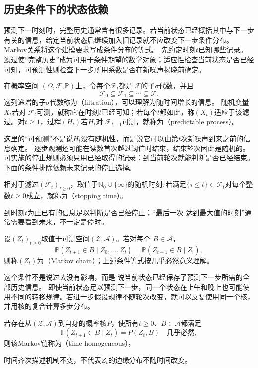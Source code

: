 \subsection{历史条件下的状态依赖}

预测下一时刻时，完整历史通常含有很多记录。若当前状态已经概括其中与下一步有关的信息，给定当前状态后继续加入旧记录就不应改变下一步条件分布。Markov关系将这个建模要求写成条件分布的等式。
\label{sec:rv-markov}
\label{sec:stoch-martingales-stopping-sequential-concentration}
先约定时刻\(t\)已知哪些记录。滤过使“完整历史”成为可用于条件期望的数学对象；适应性检查当前状态是否已经可知，可预测性则检查下一步所用系数是否在新噪声揭晓前确定。
\begin{definition}[滤过、适应与可预测性]
  \label{def:stoch-filtration-adaptation-predictability}
在概率空间
$(\Omega,\mathcal{F},\mathbb{P})$上，令每个$\mathcal{F}_t$都是
$\mathcal{F}$的子$\sigma$代数，并且
\[
  \mathcal{F}_0\subseteq\mathcal{F}_1\subseteq\cdots\subseteq\mathcal{F}.
\]
这列递增的子$\sigma$代数称为（filtration），可以理解为随时间增长的信息。
随机变量$X_t$若对
$\mathcal{F}_t$可测，就称它在时刻$t$已经可知；若每个$t$都如此，称$(X_t)$适应于该滤过。对$t\geq1$，过程$(H_t)$若$H_t$对
$\mathcal{F}_{t-1}$可测，就称为（predictable process）。
\end{definition}
这里的“可预测”不是说$H_t$没有随机性，而是说它可以由第$t$次新噪声到来之前的信息确定。
逐步观测还可能在读数首次越过阈值时结束，结束轮次因此是随机的。可实施的停止规则必须只用已经取得的记录：到当前轮次就能判断是否已经结束。下面的条件排除依赖未来记录的停止选择。
\begin{definition}[停时]
  \label{def:stoch-stopping-time}
  相对于滤过\((\mathcal F_t)_{t\geq0}\)，取值于\(\mathbb N_0\cup\{\infty\}\)的随机时刻$\tau$若满足$\{\tau\leq t\}\in\mathcal{F}_t$对每个整数$t\geq0$成立，就称为（stopping time）。
\end{definition}
到时刻$t$为止已有的信息足以判断是否已经停止；“最后一次
达到最大值的时刻”通常需要看到未来，不一定是停时。

\begin{definition}[Markov链]
  \label{def:stoch-markov-chain}
设$(Z_t)_{t\geq0}$取值于可测空间$(\mathcal{Z},\mathcal{A})$。若对每个
$B\in\mathcal{A}$，
\[
  \mathbb{P}(Z_{t+1}\in B\mid Z_0,\ldots,Z_t)
  =
  \mathbb{P}(Z_{t+1}\in B\mid Z_t),
\]
则称$(Z_t)$为（Markov chain）；上述条件等式按几乎必然意义理解。
\end{definition}
这个条件不是说过去没有影响，而是
说当前状态已经保存了预测下一步所需的全部历史信息。
即使当前状态足以预测下一步，同一个状态在上午和晚上也可能使用不同的转移规律。若进一步假设规律不随轮次改变，就可以反复使用同一个核，并用核的复合计算多步分布。
\begin{definition}[时间齐次Markov链]
  \label{def:stoch-time-homogeneous-chain}
  若存在从\((\mathcal Z,\mathcal A)\)到自身的概率核\(P\)，使所有\(t\geq0\)、\(B\in\mathcal A\)都满足
  \[ \mathbb P(Z_{t+1}\in B\mid Z_t)=P(Z_t,B)\quad\text{几乎必然}, \]
  则该Markov链称为（time-homogeneous）。
\end{definition}
时间齐次描述机制不变，不代表$Z_t$的边缘分布不随时间改变。

